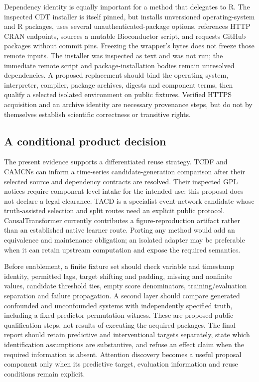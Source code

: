 Dependency identity is equally important for a method that delegates to R. The inspected CDT
installer is itself pinned, but installs unversioned operating-system and R packages, uses
several unauthenticated-package options, references HTTP CRAN endpoints, sources a mutable
Bioconductor script, and requests GitHub packages without commit pins. Freezing the wrapper's
bytes does not freeze those remote inputs. The installer was inspected as text and was not run;
the immediate remote script and package-installation bodies remain unresolved dependencies.
A proposed replacement should bind the operating system, interpreter, compiler, package archives,
digests and component terms, then qualify a selected isolated environment on public fixtures.
Verified HTTPS acquisition and an archive identity are necessary provenance steps, but do not
by themselves establish scientific correctness or transitive rights.\citep{exec28_at_cdt}

\subsection{A conditional product decision}
The present evidence supports a differentiated reuse strategy. TCDF and CAMCNs can inform a
time-series candidate-generation comparison after their selected source and dependency contracts
are resolved. Their inspected GPL notices require component-level intake for the intended use;
this proposal does not declare a legal clearance. TACD is a specialist event-network candidate
whose truth-assisted selection and split routes need an explicit public protocol. CausalTransformer
currently contributes a figure-reproduction artifact rather than an established native learner
route. Porting any method would add an equivalence and maintenance obligation; an isolated adapter
may be preferable when it can retain upstream computation and expose the required semantics.
\citep{exec28_at_tcdf,exec28_at_camcns,exec28_at_tacd,exec28_at_ct}

Before enablement, a finite fixture set should check variable and timestamp identity, permitted
lags, target shifting and padding, missing and nonfinite values, candidate threshold ties,
empty score denominators, training/evaluation separation and failure propagation. A second layer
should compare generated confounded and unconfounded systems with independently specified truth,
including a fixed-predictor permutation witness. These are proposed public qualification steps,
not results of executing the acquired packages. The final report should retain predictive and
interventional targets separately, state which identification assumptions are substantive, and
refuse an effect claim when the required information is absent.
Attention discovery becomes a useful proposal component only when its predictive target, evaluation information and reuse conditions remain explicit.
